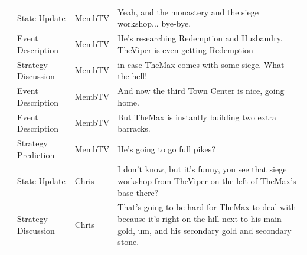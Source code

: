 {\begin{longtable}{@{}>{\theAppRow}r|L{2.3cm}L{1.0cm}U{11.55cm}@{}}
    & State Update          & MembTV       & Yeah, and the monastery and the siege workshop... bye-bye.                                                                                                                                                                                                       \\
    & Event Description     & MembTV       & He's researching Redemption and Husbandry. TheViper is even getting Redemption                                                                                                                                                                                   \\
    & Strategy Discussion   & MembTV       & in case TheMax comes with some siege. What the hell!                                                                                                                                                                                                             \\
    & Event Description     & MembTV       & And now the third Town Center is nice, going home.                                                                                                                                                                                                               \\
    & Event Description     & MembTV       & But TheMax is instantly building two extra barracks.                                                                                                                                                                                                             \\
    & Strategy Prediction   & MembTV       & He's going to go full pikes?                                                                                                                                                                                                                                     \\
    & State Update          & Chris        & I don't know, but it's funny, you see that siege workshop from TheViper on the left of TheMax's base there?                                                                                                                                                      \\
    & Strategy Discussion   & Chris        & That's going to be hard for TheMax to deal with because it's right on the hill next to his main gold, um, and his secondary gold and secondary stone.                                                                                                            \\

\end{longtable}}
